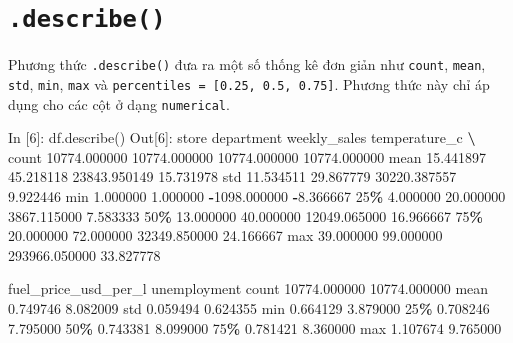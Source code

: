 \documentclass[
]{book}
\newenvironment{Shaded}{\begin{snugshade}}{\end{snugshade}}
\newcommand{\BuiltInTok}[1]{#1}
\newcommand{\DecValTok}[1]{\textcolor[rgb]{0.00,0.00,0.81}{#1}}
\newcommand{\FloatTok}[1]{\textcolor[rgb]{0.00,0.00,0.81}{#1}}
\newcommand{\NormalTok}[1]{#1}
\newcommand{\OperatorTok}[1]{\textcolor[rgb]{0.81,0.36,0.00}{\textbf{#1}}}
\begin{document}
\section{\texorpdfstring{\texttt{.describe()}}{.describe()}}\label{describe}

Phương thức \texttt{.describe()} đưa ra một số thống kê đơn giản như \texttt{count}, \texttt{mean}, \texttt{std}, \texttt{min}, \texttt{max} và \texttt{percentiles\ =\ {[}0.25,\ 0.5,\ 0.75{]}}. Phương thức này chỉ áp dụng cho các cột ở dạng \texttt{numerical}.

\begin{Shaded}
\begin{Highlighting}[]
\NormalTok{In [}\DecValTok{6}\NormalTok{]: df.describe()}
\NormalTok{Out[}\DecValTok{6}\NormalTok{]: }
\NormalTok{              store    department   weekly\_sales  temperature\_c  }\OperatorTok{\textbackslash{}}
\NormalTok{count  }\FloatTok{10774.000000}  \FloatTok{10774.000000}   \FloatTok{10774.000000}   \FloatTok{10774.000000}   
\NormalTok{mean      }\FloatTok{15.441897}     \FloatTok{45.218118}   \FloatTok{23843.950149}      \FloatTok{15.731978}   
\NormalTok{std       }\FloatTok{11.534511}     \FloatTok{29.867779}   \FloatTok{30220.387557}       \FloatTok{9.922446}   
\BuiltInTok{min}        \FloatTok{1.000000}      \FloatTok{1.000000}   \OperatorTok{{-}}\FloatTok{1098.000000}      \OperatorTok{{-}}\FloatTok{8.366667}   
\DecValTok{25}\OperatorTok{\%}        \FloatTok{4.000000}     \FloatTok{20.000000}    \FloatTok{3867.115000}       \FloatTok{7.583333}   
\DecValTok{50}\OperatorTok{\%}       \FloatTok{13.000000}     \FloatTok{40.000000}   \FloatTok{12049.065000}      \FloatTok{16.966667}   
\DecValTok{75}\OperatorTok{\%}       \FloatTok{20.000000}     \FloatTok{72.000000}   \FloatTok{32349.850000}      \FloatTok{24.166667}   
\BuiltInTok{max}       \FloatTok{39.000000}     \FloatTok{99.000000}  \FloatTok{293966.050000}      \FloatTok{33.827778}   

\NormalTok{       fuel\_price\_usd\_per\_l  unemployment  }
\NormalTok{count          }\FloatTok{10774.000000}  \FloatTok{10774.000000}  
\NormalTok{mean               }\FloatTok{0.749746}      \FloatTok{8.082009}  
\NormalTok{std                }\FloatTok{0.059494}      \FloatTok{0.624355}  
\BuiltInTok{min}                \FloatTok{0.664129}      \FloatTok{3.879000}  
\DecValTok{25}\OperatorTok{\%}                \FloatTok{0.708246}      \FloatTok{7.795000}  
\DecValTok{50}\OperatorTok{\%}                \FloatTok{0.743381}      \FloatTok{8.099000}  
\DecValTok{75}\OperatorTok{\%}                \FloatTok{0.781421}      \FloatTok{8.360000}  
\BuiltInTok{max}                \FloatTok{1.107674}      \FloatTok{9.765000}  
\end{Highlighting}
\end{Shaded}
\end{document}
